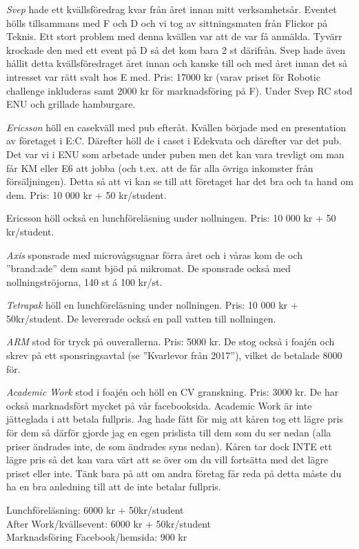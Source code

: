 \documentclass[10pt]{article}
\begin{document}
\textit{Svep} hade ett kvällsföredrag kvar från året innan mitt verksamhetsår. Eventet hölls tillsammans med F och D och vi tog av sittningsmaten från Flickor på Teknis. Ett stort problem med denna kvällen var att de var få anmälda. Tyvärr krockade den med ett event på D så det kom bara 2 st därifrån. Svep hade även hållit detta kvällsföredraget året innan och kanske till och med året innan det så intresset var rätt svalt hos E med. Pris: 17000 kr (varav priset för Robotic challenge inkluderas samt 2000 kr för marknadsföring på F). Under Svep RC stod ENU och grillade hamburgare.

\textit{Ericsson} höll en casekväll med pub efteråt. Kvällen började med en presentation av företaget i E:C. Därefter höll de i caset i Edekvata och därefter var det pub. Det var vi i ENU som arbetade under puben men det kan vara trevligt om man får KM eller E6 att jobba (och t.ex. att de får alla övriga inkomster från försäljningen). Detta så att vi kan se till att företaget har det bra och ta hand om dem. Pris: 10 000 kr + 50 kr/student.

Ericsson höll också en lunchföreläsning under nollningen. Pris: 10 000 kr + 50 kr/student.

\textit{Axis} sponsrade med microvågsugnar förra året och i våras kom de och ''brand:ade'' dem samt bjöd på mikromat. De sponsrade också med nollningströjorna, 140 st á 100 kr/st.

\textit{Tetrapak} höll en lunchföreläsning under nollningen. Pris: 10 000 kr + 50kr/student. De levererade också en pall vatten till nollningen.

\textit{ARM} stod för tryck på ouverallerna. Pris: 5000 kr. De stog också i foajén och skrev
på ett sponsringsavtal (se ''Kvarlevor från 2017''), vilket de betalade 8000 för.

\textit{Academic Work} stod i foajén och höll en CV granskning. Pris: 3000 kr. De har också marknadsfört mycket på vår facebooksida. Academic Work är inte jätteglada i att betala fullpris. Jag hade fått för mig att kåren tog ett lägre pris för dem så därför gjorde jag en egen prislista till dem som du ser nedan (alla priser ändrades inte, de som ändrades syns nedan). Kåren tar dock INTE ett lägre pris så det kan vara värt att se över om du vill fortsätta med det lägre priset eller inte. Tänk bara på att om andra företag får reda på detta måste du ha en bra anledning till att de inte betalar fullpris.

Lunchföreläsning: 6000 kr + 50kr/student\\
After Work/kvällsevent: 6000 kr + 50kr/student\\
Marknadsföring Facebook/hemsida: 900 kr\\
\end{document}
